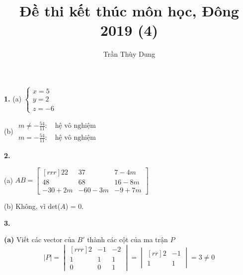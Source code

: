 \documentclass{article}
\title{Đề thi kết thúc môn học, Đông 2019 (4)}
\author{Trần Thùy Dung}
\date{}
\newcounter{Ques}[section]
\newenvironment{Ques}[1][]{%
    \stepcounter{Ques}
  \ifstrempty{#1}%
  {\mdfsetup{%
    frametitle={%
      \tikz[baseline=(current bounding box.east),outer sep=0pt]
      \node[line width=1pt,anchor=east,rectangle,draw=blue!20,fill=white]
    {\strut \color{blue5}{\textit{QUESTION}}~\theQues};}}
  }%
  {\mdfsetup{%
    frametitle={%
      \tikz[baseline=(current bounding box.east),outer sep=0pt]
      \node[line width=1pt,anchor=east,rectangle,draw=blue!20,fill=white]
    {\strut \color{black}{\textit{ANSWER}}~:~\color{blue4}{#1}};}}%
  }%
  \mdfsetup{innertopmargin=2pt,linecolor=blue!20,%
            linewidth=1pt,topline=true,%
            frametitleaboveskip=\dimexpr-\ht\strutbox\relax,}
  \begin{mdframed}[]\relax%
  }{\end{mdframed}}
\begin{document}
\iffalse
   \begin{Ques}
       \[ \systeme[xyz]{
               2x + 3y + z= 10,
               mx - 3y - 3z = 22,
               4x - 2y + 3z = -2
           }\]
   \textbf{a.} Solve the system with $m = 2$.\\ 
   \textbf{b.} chiu
    \end{Ques} 
\fi
    \maketitle

    \begin{minipage}{0.45\linewidth}

    \textbf{1.} (a) $ \begin{cases}{}
        x = 5 \\ y = 2 \\ z = -6 
    \end{cases}$


    (b) $ \begin{array}{l}
        m \ne -\frac{54}{11} : \quad \text{hệ vô nghiệm}\\
        m = -\frac{54}{11} : \quad \text{hệ vô nghiệm}
    \end{array}$

        
\end{minipage} 
\begin{minipage}{0.45\linewidth}
        \textbf{2.} 

    (a) $AB = \begin{bmatrix}[rrr]
        22 & 37 & 7 - 4m \\
        48 & 68 & 16 - 8m \\
        -30 + 2m & -60 - 3m & -9 + 7m 
    \end{bmatrix}$

    (b) Không, vì det($A$) = 0.
   

\end{minipage}

    \textbf{3.} 

    \textbf{(a)} Viết các vector của $B'$ thành các cột của ma trận $P$
    \[|P| = \begin{vmatrix}[rrr]
        2 & -1 & -2\\
        1 & 1 & 1 \\
        0 & 0 & 1 
    \end{vmatrix} = \begin{vmatrix}[rr]
        2 & -1 \\
        1 & 1 
    \end{vmatrix} = 3 \ne 0\]
\end{document}
